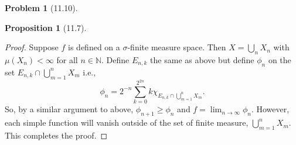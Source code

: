 \documentclass[12pt]{article}
\newcommand{\N}{\mathbb{N}}
\theoremstyle{definition}
\newtheorem{problem}{Problem}
\newtheorem*{prop}{Proposition}
\begin{document}
\begin{problem}[11.10]
\begin{prop}[11.7]
\begin{proof}
        Suppose \( f \) is defined on a \( \sigma \)-finite measure space. 
        Then \( \displaystyle X = \bigcup_{n} X_n \) with \( \mu(X_n) < \infty \) for all \( n \in \N \).
        Define \( E_{n,k} \) the same as above but define \( \phi_n \) on the set \( \displaystyle E_{n,k} \cap \bigcup_{m=1}^{n} X_m \) i.e.,
            \[
                \phi_n = 2^{-n} \sum_{k=0}^{2^{2n}} k \chi_{E_{n,k} \cap \bigcup_{m=1}^{n} X_m}.
            \]
        So, by a similar argument to above, \( \phi_{n+1} \geq \phi_n \) and \( \displaystyle f = \lim_{n \to \infty} \phi_n \). 
        However, each simple function will vanish outside of the set of finite measure, \( \displaystyle \bigcup_{m=1}^{n} X_m \).  This completes the proof.
    \end{proof}
\end{prop}
\end{problem}
\end{document}
